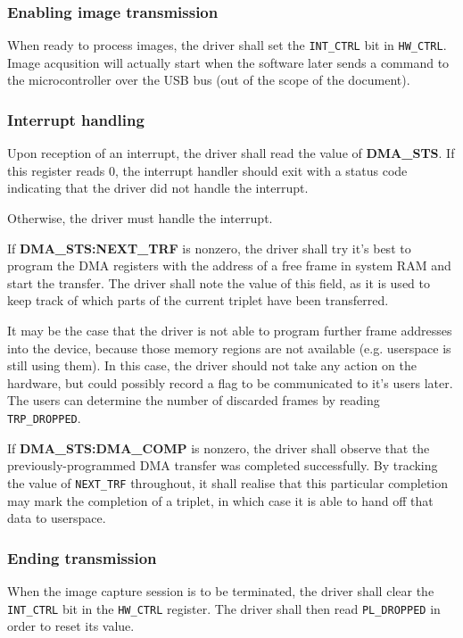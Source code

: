\documentclass[12pt]{article}
\begin{document}
\subsubsection{Enabling image transmission}

When ready to process images, the driver shall set the \texttt{INT\_CTRL} bit in \texttt{HW\_CTRL}. Image acqusition will actually start when the software later sends a command to the microcontroller over the USB bus (out of the scope of the document).

\subsubsection{Interrupt handling}

Upon reception of an interrupt, the driver shall read the value of \textbf{DMA\_STS}. If this register reads 0, the interrupt handler should exit with a status code indicating that the driver did not handle the interrupt.

Otherwise, the driver must handle the interrupt.

If \textbf{DMA\_STS:NEXT\_TRF} is nonzero, the driver shall try it's best to program the DMA registers with the address of a free frame in system RAM and start the transfer. The driver shall note the value of this field, as it is used to keep track of which parts of the current triplet have been transferred.

It may be the case that the driver is not able to program further frame addresses into the device, because those memory regions are not available (e.g. userspace is still using them). In this case, the driver should not take any action on the hardware, but could possibly record a flag to be communicated to it's users later. The users can determine the number of discarded frames by reading \texttt{TRP\_DROPPED}.

If \textbf{DMA\_STS:DMA\_COMP} is nonzero, the driver shall observe that the previously-programmed DMA transfer was completed successfully. By tracking the value of \texttt{NEXT\_TRF} throughout, it shall realise that this particular completion may mark the completion of a triplet, in which case it is able to hand off that data to userspace.

\subsubsection{Ending transmission}

When the image capture session is to be terminated, the driver shall clear the \texttt{INT\_CTRL} bit in the \texttt{HW\_CTRL} register. The driver shall then read \texttt{PL\_DROPPED} in order to reset its value.
\end{document}
